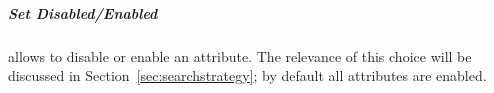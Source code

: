 \documentclass{article}
\begin{document}

\subparagraph{Set Disabled/Enabled} allows to disable or enable an
attribute. The relevance of this choice will be discussed in
Section~\ref{sec:searchstrategy}; by default all attributes are enabled.

\end{document}
